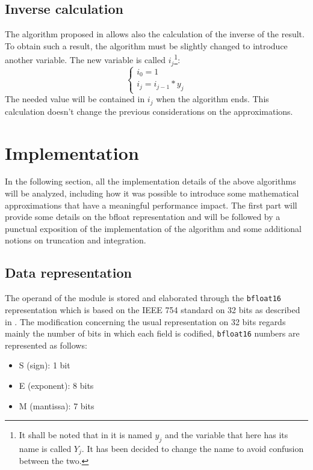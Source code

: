 \documentclass[paper=letter, fontsize=12pt]{article}
\begin{document}
\subsection{Inverse calculation}

The algorithm proposed in \cite{markstein2004software} allows also the calculation of the inverse of the result. To obtain such a result, the algorithm must be slightly changed to introduce another variable. The new variable is called \(i_j\)\footnote{It shall be noted that in \cite{markstein2004software} it is named \(y_j\) and the variable that here has its name is called \(Y_j\). It has been decided to change the name to avoid confusion between the two.}: 
\begin{equation}
\begin{cases}
i_0 = 1\\
i_j = i_{j-1} * y_j
\end{cases}
\label{eq:inverse}
\end{equation}
The needed value will be contained in \(i_j\) when the algorithm ends. This calculation doesn't change the previous considerations on the approximations.

\section{Implementation}
\label{section:impl}
In the following section, all the implementation details of the above algorithms will be analyzed, including how it was possible to introduce some mathematical approximations that have a meaningful performance impact. The first part will provide some details on the bfloat representation and will be followed by a punctual exposition of the implementation of the algorithm and some additional notions on truncation and integration.
\subsection{Data representation}
The operand of the module is stored and elaborated through the \texttt{bfloat16} representation which is based on the IEEE 754 standard on 32 bits as described in \cite{8766229}. The modification concerning the usual representation on 32 bits regards mainly the number of bits in which each field is codified, \texttt{bfloat16} numbers are represented as follows:
\begin{itemize}
    \item S (sign): 1 bit
    \item E (exponent): 8 bits
    \item M (mantissa): 7 bits
\end{itemize}
\end{document}
